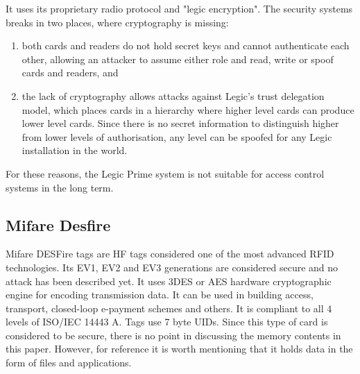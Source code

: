 It uses its proprietary radio protocol and "legic encryption". The security systems breaks in two places, where cryptography is missing:

\begin{enumerate}
    \item both cards and readers do not hold secret keys and cannot authenticate each other, allowing an attacker to assume either role and read, write or spoof cards and readers, and
    \item the lack of cryptography allows attacks against Legic's trust delegation model, which places cards in a hierarchy where higher level cards can produce lower level cards. Since there is no secret information to distinguish higher from lower levels of authorisation, any level can be spoofed for any Legic installation in the world.
\end{enumerate}
For these reasons, the Legic Prime system is not suitable for access control systems in the long term.~\cite{srlabsLegicPrime}




\subsection{Mifare Desfire}

Mifare DESFire tags are HF tags considered one of the most advanced RFID technologies.  Its EV1, EV2 and EV3 generations are considered secure and no attack has been described yet. It uses 3DES or AES hardware cryptographic engine for encoding transmission data. It can be used in building access, transport, closed-loop e-payment schemes and others. It is compliant to all 4 levels of ISO/IEC 14443 A. Tags use 7 byte UIDs. Since this type of card is considered to be secure, there is no point in discussing the memory contents in this paper. However, for reference it is worth mentioning that it holds data in the form of files and applications.~\cite{desfiredatasheet, preucil2023surveying}
